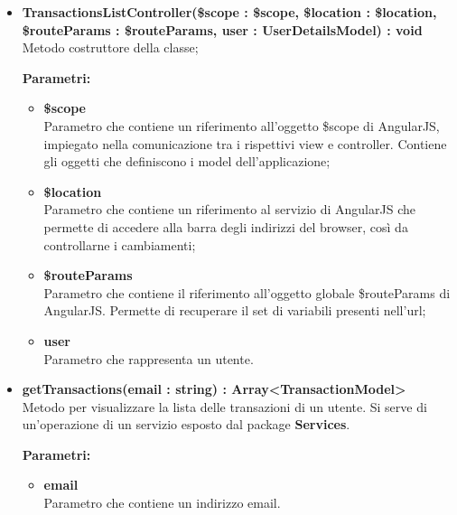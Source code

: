 \begin{itemize}
\begin{itemize}
			\item \textbf{TransactionsListController(\$scope : \$scope, \$location : \$location, \$routeParams : \$routeParams, user : UserDetailsModel) : void}\\
			Metodo costruttore della classe;
			\begin{description}
    			\item[\textbf{Parametri:}]
			\end{description}
			\begin{itemize}
				\item \textbf{\$scope}\\
				Parametro che contiene un riferimento all'oggetto \$scope di AngularJS, impiegato nella comunicazione tra i rispettivi view e controller. Contiene gli oggetti che definiscono i model dell'applicazione;
				\item \textbf{\$location}\\
				Parametro che contiene un riferimento al servizio di AngularJS che permette di accedere alla barra degli indirizzi del browser, così da controllarne i cambiamenti;
			
				\item \textbf{\$routeParams}\\
				Parametro che contiene il riferimento all'oggetto globale \$routeParams di AngularJS. Permette di recuperare il set di variabili presenti nell'url;
				
				\item \textbf{user}\\
				Parametro che rappresenta un utente.
			\end{itemize}
			
			\item \textbf{getTransactions(email : string) : Array<TransactionModel>}\\
			Metodo per visualizzare la lista delle transazioni di un utente. Si serve di un'operazione di un servizio esposto dal package \textbf{Services}.
			\begin{description}
    			\item[\textbf{Parametri:}]
			\end{description}
			\begin{itemize}
				\item \textbf{email}\\
				Parametro che contiene un indirizzo email.
			\end{itemize}
			

\end{itemize}
\end{itemize}
